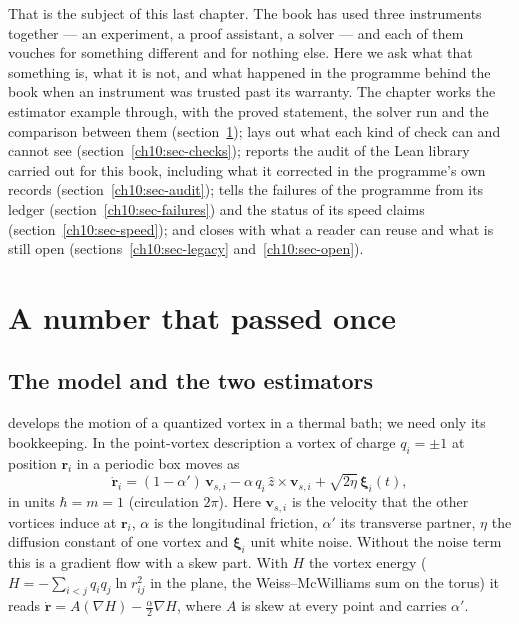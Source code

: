 That is the subject of this last chapter. The book has used three instruments together --- an experiment, a proof assistant, a solver --- and each
of them vouches for something different and for nothing else. Here we ask what that something is, what it is not, and what happened in the
programme behind the book when an instrument was trusted past its warranty. The chapter works the estimator example through, with the proved
statement, the solver run and the comparison between them (section~\ref{ch10:sec-estimator}); lays out what each kind of check can and cannot see
(section~\ref{ch10:sec-checks}); reports the audit of the Lean library carried out for this book, including what it corrected in the programme's own
records (section~\ref{ch10:sec-audit}); tells the failures of the programme from its ledger (section~\ref{ch10:sec-failures}) and the status of its
speed claims (section~\ref{ch10:sec-speed}); and closes with what a reader can reuse and what is still open
(sections~\ref{ch10:sec-legacy} and~\ref{ch10:sec-open}).

\section{A number that passed once}\label{ch10:sec-estimator}

\subsection*{The model and the two estimators}

 develops the motion of a quantized vortex in a thermal bath; we need only its bookkeeping. In the point-vortex description a vortex of
charge $q_i=\pm1$ at position $\mathbf r_i$ in a periodic box moves as
\begin{equation}\label{ch10:eq-model}
  \dot{\mathbf r}_i=(1-\alpha')\,\mathbf v_{s,i}-\alpha\,q_i\,\hat z\times\mathbf v_{s,i}+\sqrt{2\eta}\,\boldsymbol\xi_i(t),
\end{equation}
in units $\hbar=m=1$ (circulation $2\pi$). Here $\mathbf v_{s,i}$ is the velocity that the other vortices induce at $\mathbf r_i$, $\alpha$ is the
longitudinal friction, $\alpha'$ its transverse partner, $\eta$ the diffusion constant of one vortex and $\boldsymbol\xi_i$ unit white noise. Without
the noise term this is a gradient flow with a skew part. With $H$ the vortex energy ($H=-\sum_{i<j}q_iq_j\ln r_{ij}^2$ in the plane, the
Weiss--McWilliams sum on the torus) it reads $\dot{\mathbf r}=A(\nabla H)-\tfrac{\alpha}{2}\nabla H$, where $A$ is skew at every point and carries
$\alpha'$.

